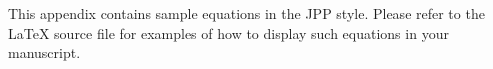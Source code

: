 \documentclass[12pt]{Style/RBM_P}
\begin{document}
\appendix

\section{}\label{appA}
This appendix contains sample equations in the JPP style. Please refer to the {\LaTeX} source file for examples of how to display such equations in your manuscript.




% 
% 



% 
\printbibliography
\end{document}
